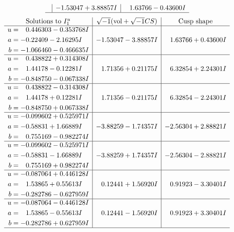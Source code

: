 \documentclass[1p]{elsarticle_modified}
\theoremstyle{definition}
\newcommand{\I}{\sqrt{-1}}
\begin{document}
$$\begin{array}{c|c|c}
 & -1.53047 + 3.88857 I & \phantom{-}1.63766 - 0.43600 I\\
 \hline 
 \end{array}$$\newpage$$\begin{array}{c|c|c}  
\text{Solutions to }I^u_{1}& \I (\text{vol} + \sqrt{-1}CS) & \text{Cusp shape}\\
 \hline 
\begin{aligned}
u &= \phantom{-}0.446303 - 0.353768 I \\
a &= -0.22409 - 2.16295 I \\
b &= -1.066460 - 0.466635 I\end{aligned}
 & -1.53047 - 3.88857 I & \phantom{-}1.63766 + 0.43600 I \\ \hline\begin{aligned}
u &= \phantom{-}0.438822 + 0.314308 I \\
a &= \phantom{-}1.44178 - 0.12281 I \\
b &= -0.848750 - 0.067338 I\end{aligned}
 & \phantom{-}1.71356 + 0.21175 I & \phantom{-}6.32854 + 2.24301 I \\ \hline\begin{aligned}
u &= \phantom{-}0.438822 - 0.314308 I \\
a &= \phantom{-}1.44178 + 0.12281 I \\
b &= -0.848750 + 0.067338 I\end{aligned}
 & \phantom{-}1.71356 - 0.21175 I & \phantom{-}6.32854 - 2.24301 I \\ \hline\begin{aligned}
u &= -0.099602 + 0.525971 I \\
a &= -0.58831 + 1.66889 I \\
b &= \phantom{-}0.755169 - 0.982274 I\end{aligned}
 & -3.88259 - 1.74357 I & -2.56304 + 2.88821 I \\ \hline\begin{aligned}
u &= -0.099602 - 0.525971 I \\
a &= -0.58831 - 1.66889 I \\
b &= \phantom{-}0.755169 + 0.982274 I\end{aligned}
 & -3.88259 + 1.74357 I & -2.56304 - 2.88821 I \\ \hline\begin{aligned}
u &= -0.087064 + 0.446128 I \\
a &= \phantom{-}1.53865 + 0.55613 I \\
b &= -0.282786 - 0.627959 I\end{aligned}
 & \phantom{-}0.12441 + 1.56920 I & \phantom{-}0.91923 - 3.30401 I \\ \hline\begin{aligned}
u &= -0.087064 - 0.446128 I \\
a &= \phantom{-}1.53865 - 0.55613 I \\
b &= -0.282786 + 0.627959 I\end{aligned}
 & \phantom{-}0.12441 - 1.56920 I & \phantom{-}0.91923 + 3.30401 I\\
 \hline 
 \end{array}$$\newpage\newpage\renewcommand{\arraystretch}{1}
\end{document}
